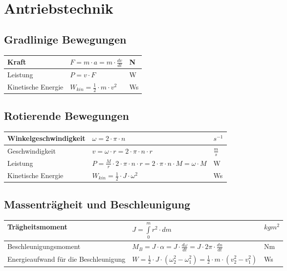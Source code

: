 \section{Antriebstechnik}

\subsection{Gradlinige Bewegungen}
\begin{tabular}[c]{ | p{5cm} | p{8cm} | p{4cm} | }
	\hline
	Kraft & $F=m\cdot a=m\cdot\frac{dv}{dt}$ & N \\
	\hline
	Leistung & $P=v\cdot F$ & W \\
	\hline
	Kinetische Energie & $W_{kin}=\frac{1}{2}\cdot m \cdot v^2$ & Ws \\
	\hline
\end{tabular}

\subsection{Rotierende Bewegungen}
\begin{tabular}[c]{ | p{5cm} | p{8cm} | p{4cm} | }
	\hline
	Winkelgeschwindigkeit & $\omega = 2\cdot\pi\cdot n$ & $s^{-1}$ \\
	\hline
	Geschwindigkeit & $v=\omega \cdot r = 2 \cdot\pi\cdot n \cdot r$ &
	$\frac{m}{s}$
	\\
	\hline
	Leistung & $P=\frac{M}{r}\cdot 2 \cdot\pi\cdot n \cdot r = 2\cdot\pi\cdot n
	\cdot M = \omega \cdot M$ & W \\
	\hline
	Kinetische Energie & $W_{kin}=\frac{1}{2}\cdot J \cdot\omega^2$ & Ws \\
	\hline
\end{tabular}

\subsection{Massenträgheit und Beschleunigung}
\begin{tabular}[c]{ | p{5cm} | p{8cm} | p{4cm} | }
	\hline
	Trägheitsmoment & $J=\int\limits_{0}^mr^2\cdot dm$ & $kgm^2$ \\
	\hline
	Beschleunigungsmoment & $M_B=J\cdot\alpha = J\cdot\frac{d\omega}{dt}=J\cdot
	2\pi\cdot\frac{dn}{dt}$ & Nm\\
	\hline
	Energieaufwand für die Beschleunigung & $W=\frac{1}{2}\cdot J \cdot
	\left(\omega_2^2-\omega_1^2\right) = \frac{1}{2}\cdot
	m\cdot\left(v_2^2-v_1^2\right)$ & Ws\\
	\hline
\end{tabular}

